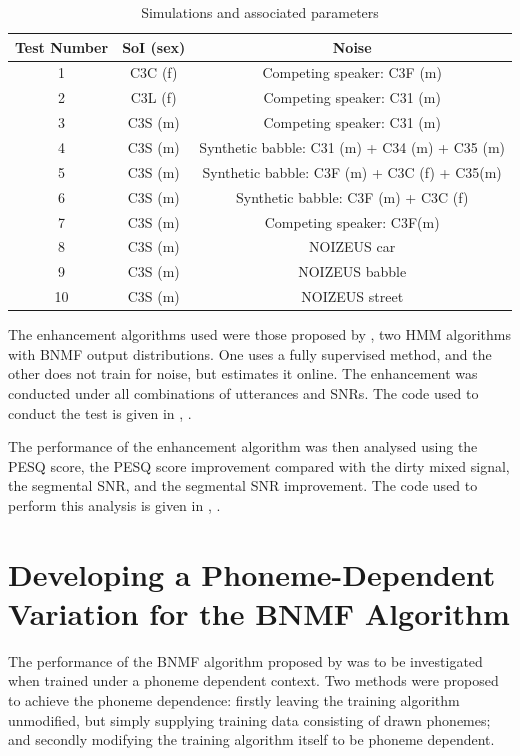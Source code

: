 \begin{table}
\protect\caption{\label{tab:test-params}Simulations and associated parameters}


\begin{centering}
\begin{tabular}{|c|c|c|}
\hline 
Test Number & \ac{SoI} (sex) & Noise\tabularnewline
\hline 
\hline 
1 & C3C (f) & Competing speaker: C3F (m)\tabularnewline
\hline 
2 & C3L (f) & Competing speaker: C31 (m)\tabularnewline
\hline 
3 & C3S (m) & Competing speaker: C31 (m)\tabularnewline
\hline 
4 & C3S (m) & Synthetic babble: C31 (m) + C34 (m) + C35 (m)\tabularnewline
\hline 
5 & C3S (m) & Synthetic babble: C3F (m) + C3C (f) + C35(m)\tabularnewline
\hline 
6 & C3S (m) & Synthetic babble: C3F (m) + C3C (f)\tabularnewline
\hline 
7 & C3S (m) & Competing speaker: C3F(m)\tabularnewline
\hline 
8 & C3S (m) & NOIZEUS car\tabularnewline
\hline 
9 & C3S (m) & NOIZEUS babble\tabularnewline
\hline 
10 & C3S (m) & NOIZEUS street\tabularnewline
\hline 
\end{tabular}
\par\end{centering}

\end{table}


The enhancement algorithms used were those proposed by \citet{mohammadiha2013supervised},
two \ac{HMM} algorithms with \ac{BNMF} output distributions. One
uses a fully supervised method, and the other does not train for noise,
but estimates it online. The enhancement was conducted under all combinations
of utterances and \acp{SNR}. The code used to conduct the test is
given in , \textit{}.

The performance of the enhancement algorithm was then analysed using
the \ac{PESQ} score, the \ac{PESQ} score improvement compared with
the dirty mixed signal, the segmental \ac{SNR}, and the segmental
\ac{SNR} improvement. The code used to perform this analysis is given
in , \textit{}.


\section{Developing a Phoneme-Dependent Variation for the \acl{BNMF} Algorithm}

The performance of the \ac{BNMF} algorithm proposed by \citet{mohammadiha2013supervised}
was to be investigated when trained under a phoneme dependent context.
Two methods were proposed to achieve the phoneme dependence: firstly
leaving the training algorithm unmodified, but simply supplying training
data consisting of drawn phonemes; and secondly modifying the training
algorithm itself to be phoneme dependent.


